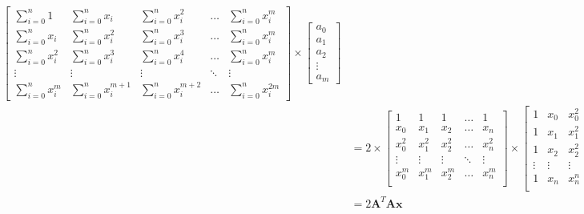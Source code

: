 \documentclass{article}
\newcommand{\x}{\mathbf{x}}
\newcommand{\A}{\mathbf{A}}
\begin{document}
\begin{equation}
\begin{split}
\begin{bmatrix}
        \sum_{i=0}^{n} 1 & \sum_{i=0}^{n} x_i & \sum_{i=0}^{n} x_i ^2 & \ldots & \sum_{i=0}^{n} x_i ^m\\
        \sum_{i=0}^{n} x_i & \sum_{i=0}^{n} x_i ^2 & \sum_{i=0}^{n} x_i ^3 & \ldots & \sum_{i=0}^{n} x_i ^m\\
        \sum_{i=0}^{n} x_i ^2 & \sum_{i=0}^{n} x_i ^3 & \sum_{i=0}^{n} x_i ^4 & \ldots & \sum_{i=0}^{n} x_i ^m\\
        \vdots & \vdots & \vdots & \ddots & \vdots \\
        \sum_{i=0}^{n} x_i ^{m} & \sum_{i=0}^{n} x_i ^{m+1} & \sum_{i=0}^{n} x_i ^{m+2} & \ldots & \sum_{i=0}^{n} x_i ^{2m}
    \end{bmatrix}
    \times
    \begin{bmatrix}
        a_0 \\
        a_1 \\
        a_2 \\
        \vdots \\
        a_m
    \end{bmatrix}\\
    & = 2 \times
    \begin{bmatrix}
        1 & 1 & 1 & \ldots & 1 \\
        x_0 & x_1 & x_2 & \ldots & x_n \\
        x_0^2 & x_1^2 & x_2 ^2 & \ldots & x_n^2 \\
        \vdots & \vdots & \vdots & \ddots & \vdots \\
        x_0^m & x_1^m & x_2 ^m & \ldots & x_n^m \\
    \end{bmatrix}
    \times
    \begin{bmatrix}
        1 & x_0 & x_0 ^2 & \ldots & x_0^m \\
        1 & x_1 & x_1 ^2 & \ldots & x_1^m \\
        1 & x_2 & x_2 ^2 & \ldots & x_2^m \\
        \vdots & \vdots & \vdots & \ddots & \vdots \\
        1 & x_n & x_n ^n & \ldots & x_n^m \\
    \end{bmatrix}
    \times
    \begin{bmatrix}
        a_0 \\
        a_1 \\
        a_2 \\
        \vdots \\
        a_m
    \end{bmatrix}\\
    &= 2\A ^T \A \x
\end{split}
\end{equation}
\end{document}

